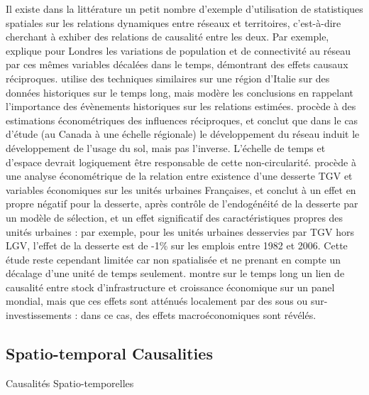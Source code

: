 {}{
Il existe dans la littérature un petit nombre d'exemple d'utilisation de statistiques spatiales sur les relations dynamiques entre réseaux et territoires, c'est-à-dire cherchant à exhiber des relations de causalité entre les deux. Par exemple, \cite{levinson2008density} explique pour Londres les variations de population et de connectivité au réseau par ces mêmes variables décalées dans le temps, démontrant des effets causaux réciproques. \cite{doi:10.1068/b39089} utilise des techniques similaires sur une région d'Italie sur des données historiques sur le temps long, mais modère les conclusions en rappelant l'importance des évènements historiques sur les relations estimées. \cite{cuthbert2005empirical} procède à des estimations économétriques des influences réciproques, et conclut que dans le cas d'étude (au Canada à une échelle régionale) le développement du réseau induit le développement de l'usage du sol, mais pas l'inverse. L'échelle de temps et d'espace devrait logiquement être responsable de cette non-circularité. \cite{koning:hal-00962384} procède à une analyse économétrique de la relation entre existence d'une desserte TGV et variables économiques sur les unités urbaines Françaises, et conclut à un effet en propre négatif pour la desserte, après contrôle de l'endogénéité de la desserte par un modèle de sélection, et un effet significatif des caractéristiques propres des unités urbaines : par exemple, pour les unités urbaines desservies par TGV hors LGV, l'effet de la desserte est de -1\% sur les emplois entre 1982 et 2006. Cette étude reste cependant limitée car non spatialisée et ne prenant en compte un décalage d'une unité de temps seulement. \cite{MANC:MANC1073} montre sur le temps long un lien de causalité entre stock d'infrastructure et croissance économique sur un panel mondial, mais que ces effets sont atténués localement par des sous ou sur-investissements : dans ce cas, des effets macroéconomiques sont révélés.
}





\subsection{Spatio-temporal Causalities}{Causalités Spatio-temporelles}


